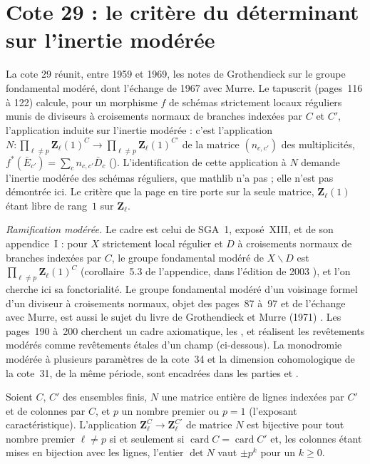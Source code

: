 \section[Cote 29 : le critère du déterminant sur l'inertie modérée]{Cote 29 : le critère du déterminant sur l'inertie modérée\protect{}}\label{sec:29}

La cote 29 réunit, entre 1959 et 1969, les notes de Grothendieck sur le groupe fondamental modéré, dont l'échange de 1967 avec Murre. Le tapuscrit  (pages~116 à 122) calcule, pour un morphisme $f$ de schémas strictement locaux réguliers munis de diviseurs à croisements normaux de branches indexées par $C$ et $C'$, l'application induite sur l'inertie modérée : c'est l'application $N : \prod_{\ell \neq p} \mathbf Z_\ell(1)^C \to \prod_{\ell \neq p} \mathbf Z_\ell(1)^{C'}$ de la matrice $(n_{c,c'})$ des multiplicités, $f^*(\bar E_{c'}) = \sum_c n_{c,c'} \bar D_c$ (). L'identification de cette application à $N$ demande l'inertie modérée des schémas réguliers, que mathlib n'a pas ; elle n'est pas démontrée ici. Le critère que la page en tire porte sur la seule matrice, $\mathbf Z_\ell(1)$ étant libre de rang~$1$ sur $\mathbf Z_\ell$.

\noindent\emph{Ramification modérée.} Le cadre est celui de SGA~1, exposé~XIII, et de son appendice~I : pour $X$ strictement local régulier et $D$ à croisements normaux de branches indexées par $C$, le groupe fondamental modéré de $X \smallsetminus D$ est $\prod_{\ell \neq p} \mathbf Z_\ell(1)^C$ (corollaire~5.3 de l'appendice, dans l'édition de 2003 \cite{sga1}), et l'on cherche ici sa fonctorialité. Le groupe fondamental modéré d'un voisinage formel d'un diviseur à croisements normaux, objet des pages~87 à~97 et de l'échange avec Murre, est aussi le sujet du livre de Grothendieck et Murre (1971) \cite{grothendieckmurre1971}. Les pages~190 à~200 cherchent un cadre axiomatique, les , et réalisent les revêtements modérés comme revêtements étales d'un champ (ci-dessous). La monodromie modérée à plusieurs paramètres de la cote~34 et la dimension cohomologique de la cote~31, de la même période, sont encadrées dans les parties  et .

\begin{encadre}
\begin{theoreme}\label{thm:29-critere}
Soient $C$, $C'$ des ensembles finis, $N$ une matrice entière de lignes indexées par $C'$ et de colonnes par $C$, et $p$ un nombre premier ou $p = 1$ (l'exposant caractéristique). L'application $\mathbf Z_\ell^C \to \mathbf Z_\ell^{C'}$ de matrice $N$ est bijective pour tout nombre premier $\ell \neq p$ si et seulement si $\operatorname{card} C = \operatorname{card} C'$ et, les colonnes étant mises en bijection avec les lignes, l'entier $\det N$ vaut $\pm p^k$ pour un $k \geq 0$.
\end{theoreme}
\end{encadre}

